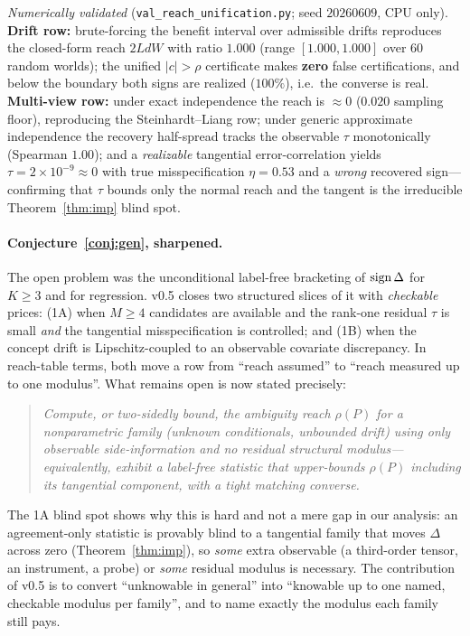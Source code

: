 \noindent\emph{Numerically validated} (\texttt{val\_reach\_unification.py};
seed $20260609$, CPU only). \textbf{Drift row:} brute-forcing the benefit
interval over admissible drifts reproduces the closed-form reach $2LdW$ with ratio
$\mathbf{1.000}$ (range $[1.000,1.000]$ over $60$ random worlds); the unified
$|c|>\rho$ certificate makes \textbf{zero} false certifications, and below the
boundary both signs are realized ($100\%$), i.e.\ the converse is real.
\textbf{Multi-view row:} under exact independence the reach is $\approx0$
($0.020$ sampling floor), reproducing the Steinhardt--Liang row; under generic
approximate independence the recovery half-spread tracks the observable $\tau$
monotonically (Spearman $\mathbf{1.00}$); and a \emph{realizable} tangential
error-correlation yields $\tau=2\times10^{-9}\!\approx\!0$ with true
misspecification $\eta=0.53$ and a \emph{wrong} recovered sign---confirming that
$\tau$ bounds only the normal reach and the tangent is the irreducible
Theorem~\ref{thm:imp} blind spot.

\paragraph{Conjecture~\ref{conj:gen}, sharpened.} The open problem was the
unconditional label-free bracketing of $\operatorname{sign}\Delta$ for $K\ge3$ and for
regression. v0.5 closes two structured slices of it with \emph{checkable}
prices: (1A) when $M\ge4$ candidates are available and the rank-one residual
$\tau$ is small \emph{and} the tangential misspecification is controlled; and
(1B) when the concept drift is Lipschitz-coupled to an observable covariate
discrepancy. In reach-table terms, both move a row from ``reach assumed'' to
``reach measured up to one modulus''. What remains open is now stated precisely:

\begin{quote}\itshape
Compute, or two-sidedly bound, the ambiguity reach $\rho(P)$ for a
\emph{nonparametric} family (unknown conditionals, unbounded drift) using
\emph{only} observable side-information and \emph{no} residual structural
modulus---equivalently, exhibit a label-free statistic that upper-bounds
$\rho(P)$ including its tangential component, with a tight matching converse.
\end{quote}

\noindent The 1A blind spot shows why this is hard and not a mere gap in our
analysis: an agreement-only statistic is provably blind to a tangential family
that moves $\Delta$ across zero (Theorem~\ref{thm:imp}), so \emph{some} extra
observable (a third-order tensor, an instrument, a probe) or \emph{some} residual
modulus is necessary. The contribution of v0.5 is to convert ``unknowable in
general'' into ``knowable up to one named, checkable modulus per family'', and to
name exactly the modulus each family still pays.


